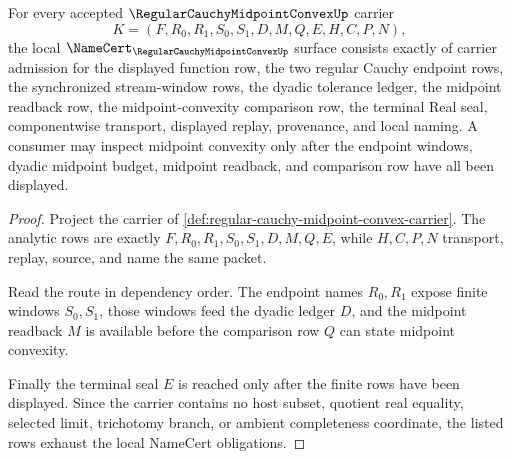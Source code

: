 \begin{theorem}
\label{thm:regular-cauchy-midpoint-convex-namecert-obligations}
For every accepted $\RegularCauchyMidpointConvexUp$ carrier
$$
K=(F,R_0,R_1,S_0,S_1,D,M,Q,E,H,C,P,N),
$$
the local $\NameCert_{\RegularCauchyMidpointConvexUp}$ surface consists exactly of carrier admission for the displayed function row, the two regular Cauchy endpoint rows, the synchronized stream-window rows, the dyadic tolerance ledger, the midpoint readback row, the midpoint-convexity comparison row, the terminal Real seal, componentwise transport, displayed replay, provenance, and local naming. A consumer may inspect midpoint convexity only after the endpoint windows, dyadic midpoint budget, midpoint readback, and comparison row have all been displayed.
\end{theorem}
\begin{proof}
Project the carrier of \autoref{def:regular-cauchy-midpoint-convex-carrier}. The analytic rows are exactly $F,R_0,R_1,S_0,S_1,D,M,Q,E$, while $H,C,P,N$ transport, replay, source, and name the same packet.

Read the route in dependency order. The endpoint names $R_0,R_1$ expose finite windows $S_0,S_1$, those windows feed the dyadic ledger $D$, and the midpoint readback $M$ is available before the comparison row $Q$ can state midpoint convexity.

Finally the terminal seal $E$ is reached only after the finite rows have been displayed. Since the carrier contains no host subset, quotient real equality, selected limit, trichotomy branch, or ambient completeness coordinate, the listed rows exhaust the local NameCert obligations.
\end{proof}

